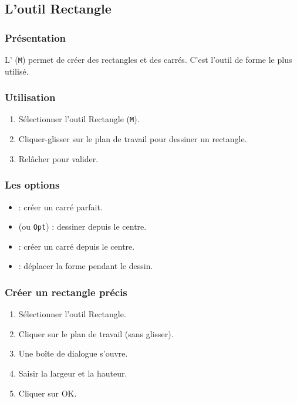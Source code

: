 \subsection{L'outil Rectangle}

\subsubsection{Présentation}

L' (\texttt{M}) permet de créer des rectangles et des carrés. C'est l'outil de forme le plus utilisé.

\subsubsection{Utilisation}

\begin{enumerate}
    \item Sélectionner l'outil Rectangle (\texttt{M}).
    \item Cliquer-glisser sur le plan de travail pour dessiner un rectangle.
    \item Relâcher pour valider.
\end{enumerate}

\subsubsection{Les options}

\begin{itemize}
    \item {} : créer un carré parfait.
    \item {} (ou \texttt{Opt}) : dessiner depuis le centre.
    \item {} : créer un carré depuis le centre.
    \item {} : déplacer la forme pendant le dessin.
\end{itemize}

\subsubsection{Créer un rectangle précis}

\begin{enumerate}
    \item Sélectionner l'outil Rectangle.
    \item Cliquer sur le plan de travail (sans glisser).
    \item Une boîte de dialogue s'ouvre.
    \item Saisir la largeur et la hauteur.
    \item Cliquer sur OK.
\end{enumerate}

